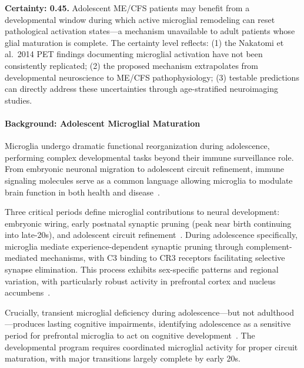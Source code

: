 \begin{hypothesis}
\label{hyp:glial-maturation-window}

\textbf{Certainty: 0.45.} Adolescent ME/CFS patients may benefit from a developmental window during which active microglial remodeling can reset pathological activation states---a mechanism unavailable to adult patients whose glial maturation is complete. The certainty level reflects: (1) the Nakatomi et al.\ 2014 PET findings documenting microglial activation have not been consistently replicated; (2) the proposed mechanism extrapolates from developmental neuroscience to ME/CFS pathophysiology; (3) testable predictions can directly address these uncertainties through age-stratified neuroimaging studies.

\paragraph{Background: Adolescent Microglial Maturation}

Microglia undergo dramatic functional reorganization during adolescence, performing complex developmental tasks beyond their immune surveillance role. From embryonic neuronal migration to adolescent circuit refinement, immune signaling molecules serve as a common language allowing microglia to modulate brain function in both health and disease~\cite{Dziabis2022microglia}.

Three critical periods define microglial contributions to neural development: embryonic wiring, early postnatal synaptic pruning (peak near birth continuing into late-20s), and adolescent circuit refinement~\cite{Dziabis2022microglia}. During adolescence specifically, microglia mediate experience-dependent synaptic pruning through complement-mediated mechanisms, with C3 binding to CR3 receptors facilitating selective synapse elimination. This process exhibits sex-specific patterns and regional variation, with particularly robust activity in prefrontal cortex and nucleus accumbens~\cite{ScienceAdvances2024adolescent,PMC11758907synapse}.

Crucially, transient microglial deficiency during adolescence---but not adulthood---produces lasting cognitive impairments, identifying adolescence as a sensitive period for prefrontal microglia to act on cognitive development~\cite{ScienceAdvances2024adolescent}. The developmental program requires coordinated microglial activity for proper circuit maturation, with major transitions largely complete by early 20s.


\end{hypothesis}
